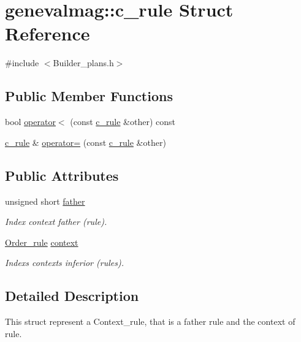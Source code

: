 \hypertarget{structgenevalmag_1_1c__rule}{
\section{genevalmag::c\_\-rule Struct Reference}
\label{structgenevalmag_1_1c__rule}
}


{\ttfamily \#include $<$Builder\_\-plans.h$>$}

\subsection*{Public Member Functions}
\begin{DoxyCompactItemize}
\item 
bool \hyperlink{structgenevalmag_1_1c__rule_a3928c94cdc0cbf19afd122f7b5f55cba}{operator$<$} (const \hyperlink{structgenevalmag_1_1c__rule}{c\_\-rule} \&other) const 
\item 
\hyperlink{structgenevalmag_1_1c__rule}{c\_\-rule} \& \hyperlink{structgenevalmag_1_1c__rule_a84c13f21cf310be7b9f8eb5677806581}{operator=} (const \hyperlink{structgenevalmag_1_1c__rule}{c\_\-rule} \&other)
\end{DoxyCompactItemize}
\subsection*{Public Attributes}
\begin{DoxyCompactItemize}
\item 
unsigned short \hyperlink{structgenevalmag_1_1c__rule_abe7fed1600af3652ab298ac2a897b18f}{father}
\begin{DoxyCompactList}\small\item\em Index context father (rule). \item\end{DoxyCompactList}\item 
\hyperlink{namespacegenevalmag_aed20da32fb9692645ae53d911d274fd5}{Order\_\-rule} \hyperlink{structgenevalmag_1_1c__rule_af0b0004a1f307e5cb18ed26d3e983f1d}{context}
\begin{DoxyCompactList}\small\item\em Indexs contexts inferior (rules). \item\end{DoxyCompactList}\end{DoxyCompactItemize}


\subsection{Detailed Description}
This struct represent a Context\_\-rule, that is a father rule and the context of rule. 

